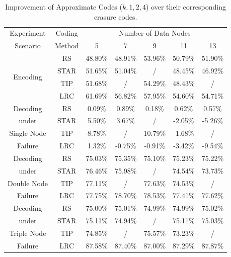 \documentclass[sigconf]{acmart}
\begin{document}
\begin{table}[]\footnotesize
\caption{Improvement of Approximate Codes ($k,1,2,4$) over their corresponding erasure codes.}\label{tab-summary}
\begin{tabular}{|c|c|c|c|c|c|c|}
\hline
Experiment & Coding & \multicolumn{5}{c|}{Number of Data Nodes} \\ \cline{3-7} 
Scenario & Method & 5 & 7 & 9 & 11 & 13 \\ \hline \hline
\multirow{4}{*}{Encoding} & RS & 48.80\% & 48.91\% & 53.96\% & 50.79\% & 51.90\% \\ \cline{2-7} 
 & STAR & 51.65\% & 51.04\% & / & 48.45\% & 46.92\% \\ \cline{2-7} 
 & TIP & 51.68\% & / & 54.29\% & 48.43\% & / \\ \cline{2-7} 
 & LRC & 61.69\% & 56.82\% & 57.95\% & 54.60\% & 54.71\% \\ \hline
Decoding & RS & 0.09\% & 0.89\% & 0.18\% & 0.62\% & 0.57\% \\ \cline{2-7} 
under & STAR & 5.50\% & 3.67\% & / & -2.05\% & -5.26\% \\ \cline{2-7} 
Single Node & TIP & 8.78\% & / & 10.79\% & -1.68\% & / \\ \cline{2-7} 
Failure & LRC & 1.32\% & -0.75\% & -0.91\% & -3.42\% & -9.54\% \\ \hline
Decoding & RS & 75.03\% & 75.35\% & 75.10\% & 75.23\% & 75.22\% \\ \cline{2-7} 
under & STAR & 76.46\% & 75.98\% & / & 74.54\% & 73.73\% \\ \cline{2-7} 
Double Node & TIP & 77.11\% & / & 77.63\% & 74.53\% & / \\ \cline{2-7} 
Failure & LRC & 77.75\% & 78.70\% & 78.53\% & 77.41\% & 77.62\% \\ \hline
Decoding & RS & 75.00\% & 75.01\% & 74.99\% & 74.99\% & 75.02\% \\ \cline{2-7} 
under & STAR & 75.11\% & 74.94\% & / & 75.11\% & 75.03\% \\ \cline{2-7} 
Triple Node & TIP & 74.85\% & / & 75.57\% & 73.23\% & / \\ \cline{2-7} 
Failure & LRC & 87.58\% & 87.40\% & 87.00\% & 87.29\% & 87.87\% \\ \hline
\end{tabular}
\end{table}
\end{document}
